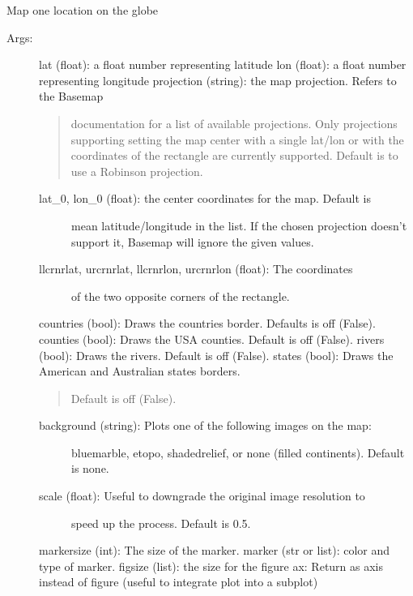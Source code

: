 \documentclass[letterpaper,10pt,english]{sphinxmanual}
\begin{document}
\begin{fulllineitems}
\label{\detokenize{Map:pyleoclim.Map.mapOne}}
Map one location on the globe
\begin{description}
\item[{Args:}] \leavevmode
lat (float): a float number representing latitude
lon (float): a float number representing longitude
projection (string): the map projection. Refers to the Basemap
\begin{quote}

documentation for a list of available projections. Only projections
supporting setting the map center with a single lat/lon or with
the coordinates of the rectangle are currently supported. 
Default is to use a Robinson projection.
\end{quote}
\begin{description}
\item[{lat\_0, lon\_0 (float): the center coordinates for the map. Default is}] \leavevmode
mean latitude/longitude in the list. 
If the chosen projection doesn’t support it, Basemap will
ignore the given values.

\item[{llcrnrlat, urcrnrlat, llcrnrlon, urcrnrlon (float): The coordinates}] \leavevmode
of the two opposite corners of the rectangle.

\end{description}

countries (bool): Draws the countries border. Defaults is off (False). 
counties (bool): Draws the USA counties. Default is off (False).
rivers (bool): Draws the rivers. Default is off (False).
states (bool): Draws the American and Australian states borders.
\begin{quote}

Default is off (False).
\end{quote}
\begin{description}
\item[{background (string): Plots one of the following images on the map: }] \leavevmode
bluemarble, etopo, shadedrelief, or none (filled continents). 
Default is none.

\item[{scale (float): Useful to downgrade the original image resolution to}] \leavevmode
speed up the process. Default is 0.5.

\end{description}

markersize (int): The size of the marker.
marker (str or list): color and type of marker. 
figsize (list): the size for the figure
ax: Return as axis instead of figure (useful to integrate plot into a subplot)

\end{description}

\end{fulllineitems}
\end{document}
